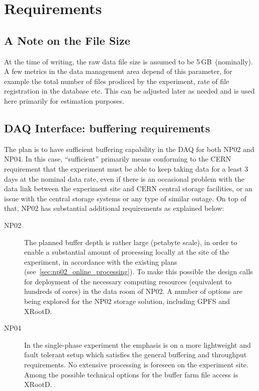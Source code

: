 \documentclass[pdftex,12pt,letter]{article}
\newcommand{\filesize}{5\,GB\ }
\begin{document}
\section{Requirements}
\subsection{A Note on the File Size}
At the time of writing, the raw data file size is assumed to be \filesize (nominally). A few metrics in the data management area depend of this
parameter, for example the total number of files prodiced by the experiment, rate of file registration in the database etc. This can be adjusted
later as needed and is used here primarily for estimation purposes.

\subsection{DAQ Interface: buffering requirements}
\label{sec:daq_interface}
The plan is to have sufficient buffering capability in the DAQ for both NP02 and NP04. In this case, ``sufficient''
primarily means conforming to the CERN requirement that the experiment must be able to keep taking data for a
least 3 days at the nominal data rate, even if there is an occasional problem with the data link between the
experiment site and CERN central storage facilities, or an issue with the central storage systems or any type of similar outage.
On top of that, NP02 has substantial additional requirements as explained below:
\begin{description}

\item[NP02] The planned buffer depth is rather large (petabyte scale), in order to enable a substantial amount of
processing locally at the site of the experiment, in accordance with the existing plans (see~\ref{sec:np02_online_processing}).
 To make this possible the design calls
for deployment of the necessary computing resources (equivalent to hundreds of cores) in the data room of NP02. A number of options are being explored
for the NP02  storage solution, including GPFS and XRootD.

\item[ NP04] In the single-phase experiment the emphasis is on a more lightweight and fault tolerant setup which satisfies the general buffering and throughput requirements.
No extensive processing is foreseen on the experiment site. Among the possible technical options for the buffer farm file access is XRootD.
\end{description}
\end{document}
